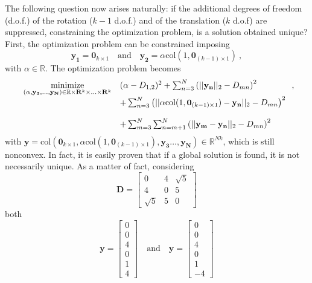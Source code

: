 \documentclass[12pt]{article}
\begin{document}
The following question now arises naturally: if the additional degrees of freedom (d.o.f.) of the rotation ($k-1$ d.o.f.) and of the translation ($k$ d.o.f) are suppressed, constraining the optimization problem, is a solution obtained unique? First, the optimization problem can be constrained imposing 
\begin{equation*}\label{key}
\mathbf{y_1} = \mathbf{0}_{k\times 1} \quad \text{and}  \quad  \mathbf{y_2} = \alpha\mathrm{col}(1,\mathbf{0}_{(k-1)\times 1})\:,
\end{equation*} 
with $\alpha \in \mathbb{R}$. The optimization problem becomes 
\begin{equation}\label{eq:problemModifiedT4}
\begin{array}[t]{ll} 
\underset{(\alpha,\mathbf{y_3},\ldots,\mathbf{y_N}) \in \mathbb{R} \times \mathbf{R}^{k}\times \ldots \times \mathbf{R}^{k} }{\text{minimize}} & (\alpha-D_{1,2})^2+\sum_{n=3}^{N}\left(||\mathbf{y_n}||_2-D_{mn}\right)^2\\
&+ \sum_{n=3}^{N}\left(||\alpha\mathrm{col}(1,\mathbf{0}_{(k-1)\times 1})-\mathbf{y_n}||_2-D_{mn}\right)^2\\
&\\
& +\sum_{m=3}^{N}\sum_{n=m+1}^{N}\left(||\mathbf{y_m}-\mathbf{y_n}||_2-D_{mn}\right)^2
\end{array}\:,
\end{equation}
with 
$\mathbf{y} = \mathrm{col}\left(\mathbf{0}_{k\times 1},\alpha\mathrm{col}(1,\mathbf{0}_{(k-1)\times 1}),\mathbf{y_3} \ldots,\mathbf{y_N}\right) \in \mathbb{R}^{Nk}$, which is still nonconvex. In fact, it is easily proven that if a global solution is found, it is not necessarily unique. As a matter of fact, considering 
\begin{equation*}\label{key}
\mathbf{D} = \begin{bmatrix}
0 & 4 & \sqrt{5} \\ 4 & 0 & 5 \\ \sqrt{5} & 5 & 0 
\end{bmatrix}
\end{equation*} 
both 
\begin{equation*}\label{key}
\mathbf{y} = \begin{bmatrix}
0 \\ 0 \\ 4 \\ 0 \\ 1 \\ 4 
\end{bmatrix}\quad \text{and} \quad \mathbf{y} = \begin{bmatrix}
0 \\ 0 \\ 4 \\ 0 \\ 1 \\ -4 
\end{bmatrix}
\end{equation*}
\end{document}
